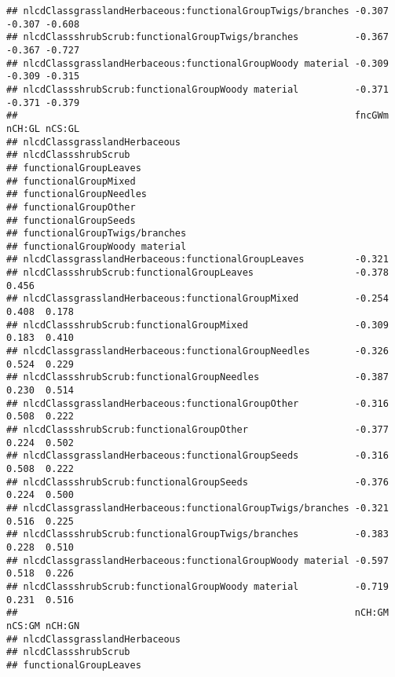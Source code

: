 \documentclass[]{article}
\begin{document}
\begin{verbatim}
## nlcdClassgrasslandHerbaceous:functionalGroupTwigs/branches -0.307 -0.307 -0.608
## nlcdClassshrubScrub:functionalGroupTwigs/branches          -0.367 -0.367 -0.727
## nlcdClassgrasslandHerbaceous:functionalGroupWoody material -0.309 -0.309 -0.315
## nlcdClassshrubScrub:functionalGroupWoody material          -0.371 -0.371 -0.379
##                                                            fncGWm nCH:GL nCS:GL
## nlcdClassgrasslandHerbaceous                                                   
## nlcdClassshrubScrub                                                            
## functionalGroupLeaves                                                          
## functionalGroupMixed                                                           
## functionalGroupNeedles                                                         
## functionalGroupOther                                                           
## functionalGroupSeeds                                                           
## functionalGroupTwigs/branches                                                  
## functionalGroupWoody material                                                  
## nlcdClassgrasslandHerbaceous:functionalGroupLeaves         -0.321              
## nlcdClassshrubScrub:functionalGroupLeaves                  -0.378  0.456       
## nlcdClassgrasslandHerbaceous:functionalGroupMixed          -0.254  0.408  0.178
## nlcdClassshrubScrub:functionalGroupMixed                   -0.309  0.183  0.410
## nlcdClassgrasslandHerbaceous:functionalGroupNeedles        -0.326  0.524  0.229
## nlcdClassshrubScrub:functionalGroupNeedles                 -0.387  0.230  0.514
## nlcdClassgrasslandHerbaceous:functionalGroupOther          -0.316  0.508  0.222
## nlcdClassshrubScrub:functionalGroupOther                   -0.377  0.224  0.502
## nlcdClassgrasslandHerbaceous:functionalGroupSeeds          -0.316  0.508  0.222
## nlcdClassshrubScrub:functionalGroupSeeds                   -0.376  0.224  0.500
## nlcdClassgrasslandHerbaceous:functionalGroupTwigs/branches -0.321  0.516  0.225
## nlcdClassshrubScrub:functionalGroupTwigs/branches          -0.383  0.228  0.510
## nlcdClassgrasslandHerbaceous:functionalGroupWoody material -0.597  0.518  0.226
## nlcdClassshrubScrub:functionalGroupWoody material          -0.719  0.231  0.516
##                                                            nCH:GM nCS:GM nCH:GN
## nlcdClassgrasslandHerbaceous                                                   
## nlcdClassshrubScrub                                                            
## functionalGroupLeaves                                                          

\end{verbatim}
\end{document}
